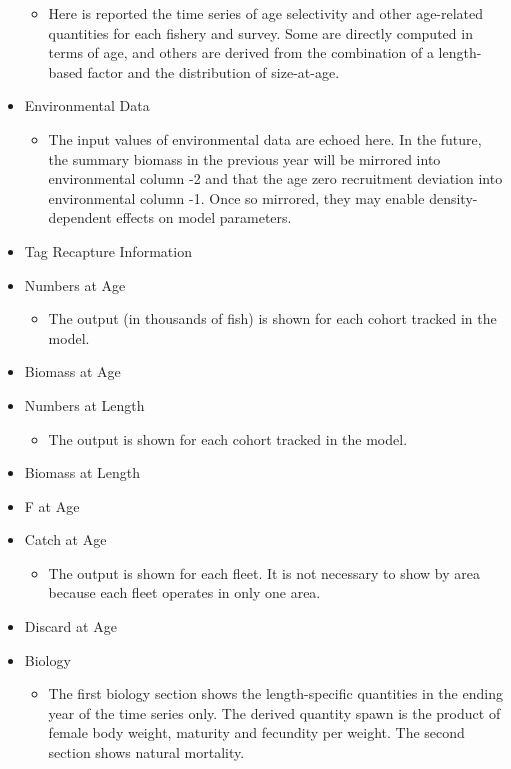 \begin{itemize}
\begin{itemize}
		\item Here is reported the time series of age selectivity and other age-related quantities for each fishery and survey. Some are directly computed in terms of age, and others are derived from the combination of a length-based factor and the distribution of size-at-age.
	\end{itemize}
	\item Environmental Data
	\begin{itemize}
		\item The input values of environmental data are echoed here. In the future, the summary biomass in the previous year will be mirrored into environmental column -2 and that the age zero recruitment deviation into environmental column -1. Once so mirrored, they may enable density-dependent effects on model parameters.
	\end{itemize}
	\item Tag Recapture Information
	\item Numbers at Age
	\begin{itemize}
		\item The output (in thousands of fish) is shown for each cohort tracked in the model.
	\end{itemize}
	\item Biomass at Age
	\item Numbers at Length
	\begin{itemize}
		\item The output is shown for each cohort tracked in the model.
	\end{itemize}
	\item Biomass at Length
	\item F at Age
	\item Catch at Age
	\begin{itemize}
		\item The output is shown for each fleet.  It is not necessary to show by area because each fleet operates in only one area.
	\end{itemize}
	\item Discard at Age
	\item Biology
	\begin{itemize}
		\item The first biology section shows the length-specific quantities in the ending year of the time series only. The derived quantity spawn is the product of female body weight, maturity and fecundity per weight. The second section shows natural mortality.
	\end{itemize}

\end{itemize}
